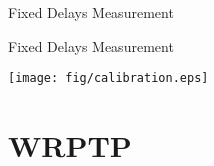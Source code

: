 \documentclass[compress,red]{beamer}
\begin{document}
\logo{}
\begin{frame}{Fixed Delays Measurement}


\end{frame}
\begin{frame}{Fixed Delays Measurement}

  \begin{center}
  \texttt{[image: fig/calibration.eps]}
  \end{center}

\end{frame}
\section{WRPTP}
\end{document}
